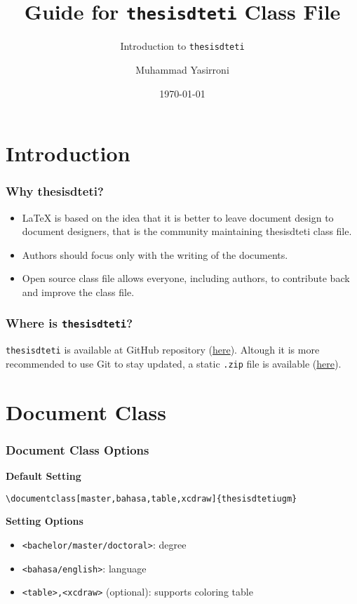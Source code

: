 \documentclass{beamer}
\title{Guide for \texttt{thesisdteti} Class File}
\subtitle{Introduction to \texttt{thesisdteti}}
\author{Muhammad Yasirroni}
\institute{Universitas Gadjah Mada}
\date{\today}
\begin{document}
\begin{frame}
  \titlepage
\end{frame}

\section{Introduction}
\begin{frame}
    \frametitle{Why thesisdteti?}
    \begin{itemize}
      \item LaTeX is based on the idea that it is better to leave document design to document designers, that is the community maintaining thesisdteti class file.
      \item Authors should focus only with the writing of the documents.
      \item Open source class file allows everyone, including authors, to contribute back and improve the class file.
    \end{itemize}
\end{frame}

\begin{frame}
  \frametitle{Where is \texttt{thesisdteti}?}
  \texttt{thesisdteti} is available at GitHub repository (\href{https://github.com/yasirroni/thesisdtetiugm}{here}). Altough it is more recommended to use Git to stay updated, a static \texttt{.zip} file is available (\href{https://github.com/yasirroni/thesisdtetiugm/archive/refs/heads/master.zip}{here}).
\end{frame}

\section{Document Class}

\begin{frame}[fragile]
  \frametitle{Document Class Options}

  \textbf{Default Setting}

  \begin{block}{}
    \vspace{-2em}
    \small
    \begin{verbatim}
\documentclass[master,bahasa,table,xcdraw]{thesisdtetiugm}
    \end{verbatim}
  \end{block}

  \textbf{Setting Options}

  \begin{itemize}
    \item \texttt{<bachelor/master/doctoral>}: degree
    \item \texttt{<bahasa/english>}: language
    \item \texttt{<table>,<xcdraw>} (optional): supports coloring table
  \end{itemize}

\end{frame}
\end{document}
